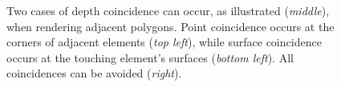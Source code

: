 \documentclass[review,journal]{vgtc}         %
\begin{document}
\begin{figure}[b]
\begin{minipage}{1.5cm}
     \end{minipage}
     \begin{minipage}{4.25cm} 
     \end{minipage}
     \begin{minipage}{2.75cm} 
     \end{minipage}    
  \caption{Two cases of depth coincidence can occur, as illustrated ({\it middle}), when rendering adjacent polygons. Point coincidence occurs at the corners of adjacent elements ({\it top left}), while surface coincidence occurs at the touching element's surfaces ({\it bottom left}). All coincidences can be avoided ({\it right}).}  
  \label{fig:depthcoincidence}
\end{figure}
\end{document}
